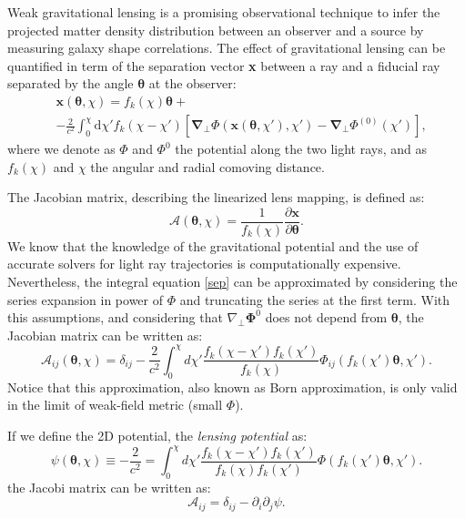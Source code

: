 \documentclass[twocolumn,twocolappendix]{aastex63}
\begin{document}
Weak gravitational lensing is a promising observational technique to infer the projected matter density distribution between an observer and a source by measuring galaxy shape correlations. 
The effect of gravitational lensing 
can be quantified in term of the separation vector \textbf{x} between a ray and a fiducial ray separated by the angle $\boldsymbol{\theta}$ at the observer:
\begin{align}\label{sep}
   & \textbf{x}(\boldsymbol{\theta},\chi) =
    f_k(\chi)\boldsymbol{\theta} + \\
   &- \frac{2}{c^2}
    \int_0^{\chi}
    \text{d}\chi'
    f_k(\chi-\chi')
    [ \boldsymbol{\nabla_{\bot}}\Phi( \textbf{x}(\boldsymbol{\theta},\chi'),\chi')-
    \boldsymbol{\nabla_{\bot}}\Phi^{(0)}(\chi')
    ],
\end{align}
where we denote as $\Phi$ and $\Phi^{0}$ the potential along the two light rays, and as $f_k(\chi)$ and $\chi$ the angular and radial comoving distance.

The Jacobian matrix, describing the linearized lens mapping, is defined as:
\begin{equation}
\mathcal{A}(\boldsymbol{\theta},\chi)=
\frac{1}{f_{k}(\chi)}
\frac{\partial \textbf{x}}{\partial \boldsymbol{\theta}}.
\end{equation}
We know that the knowledge of the gravitational potential and the use of accurate solvers for light ray trajectories is computationally expensive. Nevertheless, the integral equation \ref{sep} can be approximated by considering the series expansion in power of $\Phi$ and truncating the series at the first term.
With this assumptions, and considering that $\nabla_{\bot}\boldsymbol{\Phi}^0$ does not depend from $\boldsymbol{\theta}$, the Jacobian matrix can be written as:
\begin{equation}
    \mathcal{A}_{ij}(\boldsymbol{\theta},\chi)
     =\delta_{ij}-\frac{2}{c^2}
    \int_0^{\chi} d\chi'
     \frac{f_k(\chi-\chi')f_k(\chi')}{f_k(\chi)}
     \Phi_{ij}(f_k(\chi')\boldsymbol{\theta},\chi').
\end{equation}
Notice that this approximation, also known as Born approximation, is only valid in the limit of weak-field metric (small $\Phi$). 


If we define the 2D potential, the \textit{lensing potential} as:
\begin{equation}
    \psi(\boldsymbol{\theta},\chi) \equiv
 -\frac{2}{c^2}
= \int_0^{\chi} d\chi'
   \frac{f_k(\chi-\chi')f_k(\chi')}{f_k(\chi)f_k(\chi')}
  \Phi(f_k(\chi')\boldsymbol{\theta},\chi').
\end{equation}
 the Jacobi matrix can be written as:
\begin{equation}
    \mathcal{A}_{ij}=\delta_{ij}-\partial_i \partial_j\psi. 
\end{equation}
\end{document}
